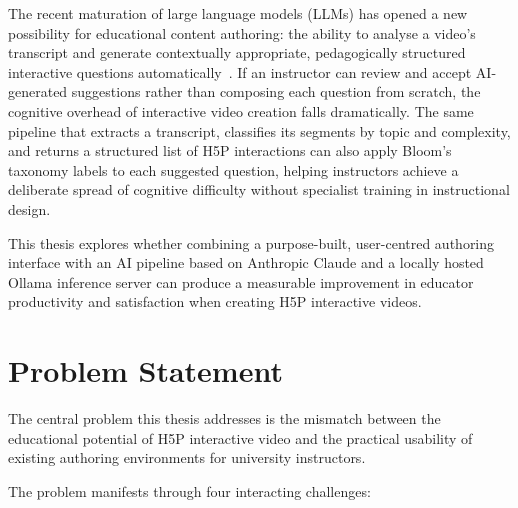 The recent maturation of large language models (LLMs) has opened a new
possibility for educational content authoring: the ability to analyse a
video's transcript and generate contextually appropriate, pedagogically
structured interactive questions
automatically~\cite{brown2020,anthropic2024}. If an instructor can review
and accept AI-generated suggestions rather than composing each question from
scratch, the cognitive overhead of interactive video creation falls
dramatically. The same pipeline that extracts a transcript, classifies its
segments by topic and complexity, and returns a structured list of H5P
interactions can also apply Bloom's taxonomy labels to each suggested
question, helping instructors achieve a deliberate spread of cognitive
difficulty without specialist training in instructional design.

This thesis explores whether combining a purpose-built, user-centred
authoring interface with an AI pipeline based on Anthropic Claude and a
locally hosted Ollama inference server can produce a measurable improvement
in educator productivity and satisfaction when creating H5P interactive
videos.

\section{Problem Statement}

The central problem this thesis addresses is the mismatch between the
educational potential of H5P interactive video and the practical usability
of existing authoring environments for university instructors.

The problem manifests through four interacting challenges:

